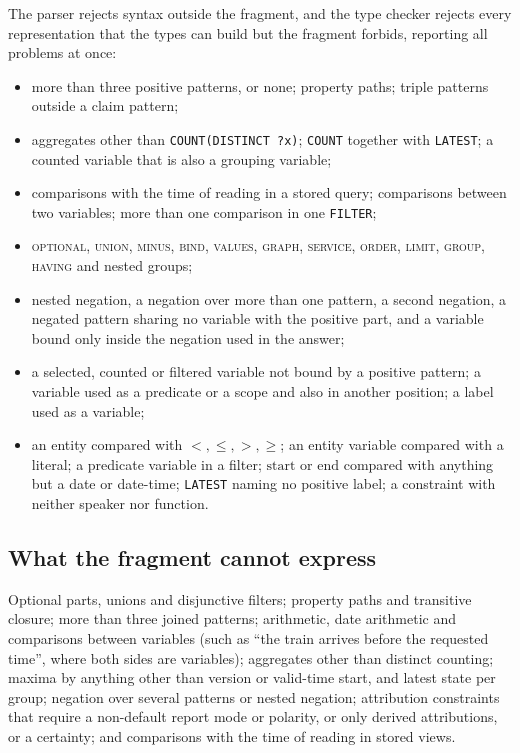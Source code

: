 The parser rejects syntax outside the fragment, and the type checker rejects every representation
that the types can build but the fragment forbids, reporting all problems at once:

\begin{itemize}
\item more than three positive patterns, or none; property paths; triple patterns outside a claim
  pattern;
\item aggregates other than \texttt{COUNT(DISTINCT ?x)}; \texttt{COUNT} together with
  \texttt{LATEST}; a counted variable that is also a grouping variable;
\item comparisons with the time of reading in a stored query; comparisons between two variables;
  more than one comparison in one \texttt{FILTER};
\item \textsc{optional}, \textsc{union}, \textsc{minus}, \textsc{bind}, \textsc{values},
  \textsc{graph}, \textsc{service}, \textsc{order}, \textsc{limit}, \textsc{group},
  \textsc{having} and nested groups;
\item nested negation, a negation over more than one pattern, a second negation, a negated pattern
  sharing no variable with the positive part, and a variable bound only inside the negation used in
  the answer;
\item a selected, counted or filtered variable not bound by a positive pattern; a variable used as
  a predicate or a scope and also in another position; a label used as a variable;
\item an entity compared with $<,\le,>,\ge$; an entity variable compared with a literal; a
  predicate variable in a filter; $\mathrm{start}$ or $\mathrm{end}$ compared with anything but a
  date or date-time; \texttt{LATEST} naming no positive label; a constraint with neither speaker
  nor function.
\end{itemize}

\subsection{What the fragment cannot express}

Optional parts, unions and disjunctive filters; property paths and transitive closure; more than
three joined patterns; arithmetic, date arithmetic and comparisons between variables (such as
``the train arrives before the requested time'', where both sides are variables); aggregates other
than distinct counting; maxima by anything other than version or valid-time start, and latest
state per group; negation over several patterns or nested negation; attribution constraints that
require a non-default report mode or polarity, or only derived attributions, or a certainty; and
comparisons with the time of reading in stored views.
